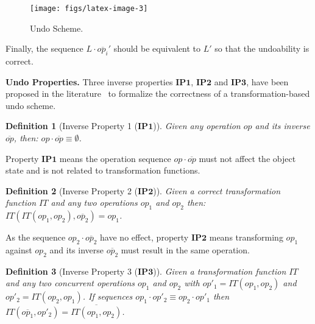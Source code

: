\documentclass[submission,copyright,creativecommons]{eptcs}
\newtheorem{definition}{Definition}
\begin{document}
\begin{figure}[!h]
\vspace{-.5cm}
\begin{scriptsize}
\centerline{\texttt{[image: figs/latex-image-3]}}
\end{scriptsize}
\vspace{-.2cm}
\caption{Undo Scheme.}\label{fig:undoScheme}
\end{figure}
 
Finally, the sequence $L\cdot \overline{op_i}'$ should be equivalent to $L'$ so that the undoability is correct.



\medskip\noindent\textbf{Undo Properties. }Three inverse properties $\mathbf{IP1}$, $\mathbf{IP2}$ and $\mathbf{IP3}$, have been proposed in the literature~\cite{Atul94,Sun02,SunS09,Ferrie04} to formalize the correctness of a transformation-based undo scheme.

\begin{definition}[Inverse Property 1 ($\mathbf{IP1}$)]
\label{Def:IP1}
Given  any operation $op$ and its inverse $\overline{op}$, then:
$ op\cdot \overline{op}\equiv \emptyset$.\end{definition}


Property $\mathbf{IP1}$ means the operation sequence $op \cdot \overline{op}$ must not affect  the object state and is not related to transformation functions.



\begin{definition}[Inverse Property 2 ($\mathbf{IP2}$)]
\label{Def:IP2}
Given a correct transformation function $IT$ and any two  operations $op_1$ and $op_2$ then:
$IT(IT(op_1,op_2), \overline{op_2})= op_1$.
\end{definition}

As the sequence $op_2 \cdot \overline{op_2}$  have no effect, property $\mathbf{IP2}$ means transforming $op_1$
against $op_2$ and its inverse $\overline{op_2}$ must result in the same operation.


\begin{definition}[Inverse Property 3 ($\mathbf{IP3}$)]
\label{Def:IP3}
Given a transformation function $IT$ and any two  concurrent operations $op_1$ and $op_2$ with
$op'_1=IT(op_1,op_2)$ and $op'_2=IT(op_2,op_1)$. If sequences $ op_1\cdot op'_2 \equiv op_2\cdot op'_1$
 then
$IT(\overline{op_1}, op'_2) = \overline{IT(op_1,op_2)}$.
\end{definition}
\end{document}

